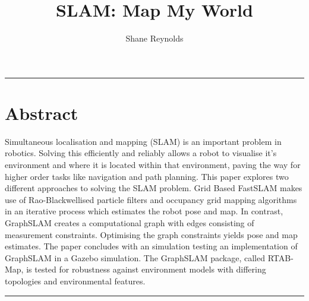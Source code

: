 \documentclass[a4paper]{article}
\begin{document}
\title{SLAM: Map My World}
\author{Shane Reynolds}
\maketitle

\rule{\textwidth}{1pt}
\section*{Abstract}
Simultaneous localisation and mapping (SLAM) is an important problem in robotics. Solving this efficiently and reliably allows a robot to visualise it's environment and where it is located within that environment, paving the way for higher order tasks like navigation and path planning. This paper explores two different approaches to solving the SLAM problem. Grid Based FastSLAM makes use of Rao-Blackwellised particle filters and occupancy grid mapping algorithms in an iterative process which estimates the robot pose and map. In contrast, GraphSLAM creates a computational graph with edges consisting of measurement constraints. Optimising the graph constraints yields pose and map estimates. The paper concludes with an simulation testing an implementation of GraphSLAM in a Gazebo simulation. The GraphSLAM package, called RTAB-Map, is tested for robustness against environment models with differing topologies and environmental features.\\

\rule{\textwidth}{1pt}
\end{document}

